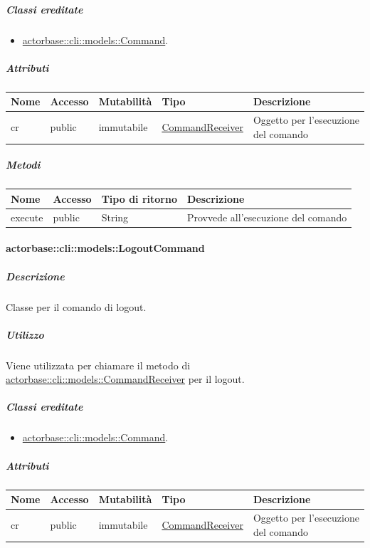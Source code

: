 \documentclass{scalatekids-article}
\begin{document}
\subparagraph{Classi ereditate}
\begin{itemize}
\item \hyperref[sec:actorbase::cli::models::Command]{actorbase::cli::models::Command}.
\end{itemize}

\subparagraph{Attributi}

\begin{tabular}{| p{1cm} | p{1.5cm} | p{2cm} | p{4cm} | p{8.5cm} |}
  \hline
  Nome & Accesso & Mutabilità & Tipo & Descrizione\\
  \hline
  cr & public & immutabile & \hyperref[sec:actorbase::cli::models::CommandReceiver]{CommandReceiver} & Oggetto per l'esecuzione del comando \\
  \hline
\end{tabular}

\subparagraph{Metodi}

\begin{tabular}{| l | l | l | l |}
  \hline
  Nome & Accesso & Tipo di ritorno & Descrizione\\
  \hline
  execute & public & String & Provvede all'esecuzione del comando\\
  \hline
\end{tabular}

\paragraph{actorbase::cli::models::LogoutCommand}
\label{sec:actorbase::cli::models::LogoutCommand}

\subparagraph{Descrizione}

Classe per il comando di logout.

\subparagraph{Utilizzo}

Viene utilizzata per chiamare il metodo di
\hyperref[sec:actorbase::cli::models::CommandReceiver]{actorbase::cli::models::CommandReceiver} per il logout.

\subparagraph{Classi ereditate}

\begin{itemize}
\item \hyperref[sec:actorbase::cli::models::Command]{actorbase::cli::models::Command}.
\end{itemize}

\subparagraph{Attributi}

\begin{tabular}{| p{1cm} | p{1.5cm} | p{2cm} | p{4cm} | p{8.5cm} |}
  \hline
  Nome & Accesso & Mutabilità & Tipo & Descrizione\\
  \hline
  cr & public & immutabile & \hyperref[sec:actorbase::cli::models::CommandReceiver]{CommandReceiver} & Oggetto per l'esecuzione del comando\\
  \hline
\end{tabular}
\end{document}
